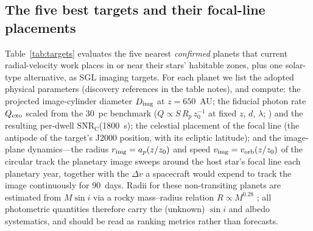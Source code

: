﻿\documentclass[twocolumn,10pt]{article}
\begin{document}
\subsection{The five best targets and their focal-line placements}
\label{sec:targets}

Table~\ref{tab:targets} evaluates the five nearest {\it confirmed}
planets that current radial-velocity work places in or near their
stars' habitable zones, plus one solar-type alternative, as SGL imaging
targets. For each planet we list the adopted physical parameters
(discovery references in the table notes), and compute: the projected
image-cylinder diameter $D_{\rm img}$ at $z=650$~AU; the fiducial
photon rate $Q_{\rm exo}$ scaled from the 30~pc benchmark
($Q\propto S\,R_p\,z_0^{-1}$ at fixed $z$, $d$, $\lambda$;
\citealt{tt22mnras}) and the resulting per-dwell
$\mathrm{SNR_C}$(1800~s); the celestial placement of the focal line
(the antipode of the target's J2000 position, with its ecliptic
latitude); and the image-plane dynamics---the radius
$r_{\rm img}=a_p(z/z_0)$ and speed
$v_{\rm img}=v_{\rm orb}(z/z_0)$ of the circular track the planetary
image sweeps around the host star's focal line each planetary year,
together with the $\Delta v$ a spacecraft would expend to track the
image continuously for 90~days. Radii for these non-transiting planets
are estimated from $M\sin i$ via a rocky mass--radius relation
$R\propto M^{0.28}$ \citep{chenkipping17}; all photometric quantities
therefore carry the (unknown) $\sin i$ and albedo systematics, and
should be read as ranking metrics rather than forecasts.
\end{document}
